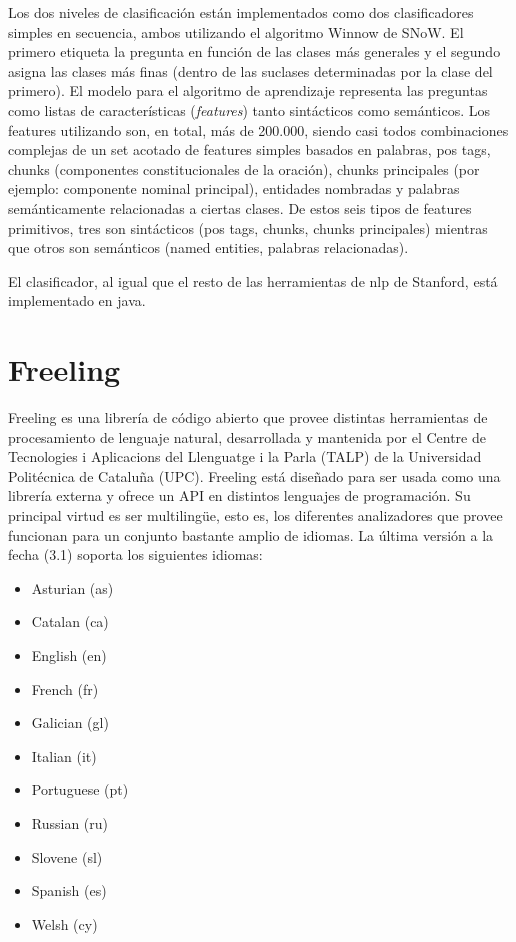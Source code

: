 Los dos niveles de clasificación están implementados como dos clasificadores simples en secuencia, ambos utilizando el algoritmo Winnow de SNoW. El primero etiqueta la pregunta en función de las clases más generales y el segundo asigna las clases más finas (dentro de las suclases determinadas por la clase del primero).
El modelo para el algoritmo de aprendizaje representa las preguntas como listas de características (\textit{features}) tanto sintácticos como semánticos. Los features utilizando son, en total, más de 200.000, siendo casi todos combinaciones complejas de un set acotado de features simples basados en palabras, pos tags, chunks (componentes constitucionales de la oración), chunks principales (por ejemplo: componente nominal principal), entidades nombradas y palabras semánticamente relacionadas a ciertas clases. De estos seis tipos de features primitivos, tres son sintácticos (pos tags, chunks, chunks principales) mientras que otros son semánticos (named entities, palabras relacionadas).

El clasificador, al igual que el resto de las herramientas de nlp de Stanford, está implementado en java.




\section{Freeling}
\label{sec:freeling}
\label{subsec:freeling-pos}
\label{subsec:freeling-mods}
Freeling es una librería de c\'odigo abierto que provee distintas herramientas de
procesamiento de lenguaje natural, desarrollada y mantenida por el Centre de Tecnologies
i Aplicacions del Llenguatge i la Parla (TALP) de la Universidad Politécnica de Catalu\~na (UPC).
Freeling está dise\~nado para ser usada como una librería externa y ofrece un API en distintos lenguajes
de programaci\'on. Su principal virtud es ser multilingüe, esto es, los diferentes analizadores que provee funcionan
para un conjunto bastante amplio de idiomas. La última versi\'on a la fecha (3.1) soporta los siguientes idiomas:

\begin{itemize}
\item Asturian (as)
\item Catalan (ca)
\item English (en)
\item French (fr)
\item Galician (gl)
\item Italian (it)
\item Portuguese (pt)
\item Russian (ru)
\item Slovene (sl)
\item Spanish (es)
\item Welsh (cy)
\end{itemize}


